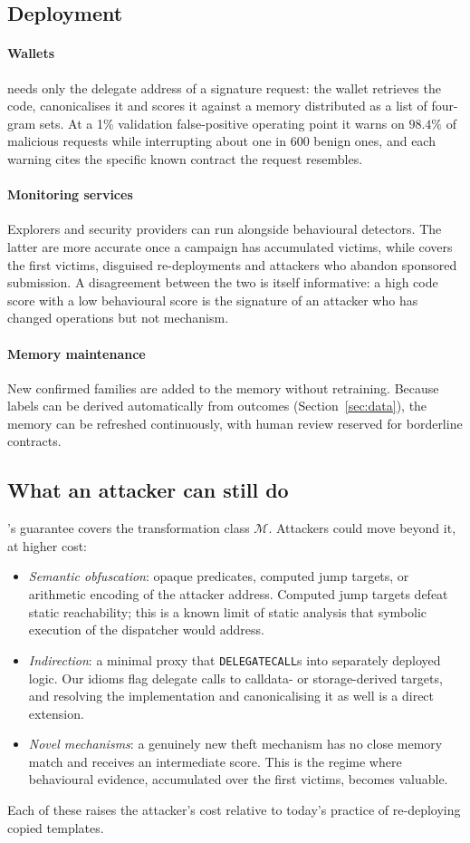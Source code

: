\subsection{Deployment}
\paragraph{Wallets} \dn{} needs only the delegate address of a signature request: the wallet retrieves the code, canonicalises it and scores it against a memory distributed as a list of four-gram sets. At a 1\% validation false-positive operating point it warns on $98.4\%$ of malicious requests while interrupting about one in $600$ benign ones, and each warning cites the specific known contract the request resembles.
\paragraph{Monitoring services} Explorers and security providers can run \dn{} alongside behavioural detectors. The latter are more accurate once a campaign has accumulated victims, while \dn{} covers the first victims, disguised re-deployments and attackers who abandon sponsored submission. A disagreement between the two is itself informative: a high code score with a low behavioural score is the signature of an attacker who has changed operations but not mechanism.
\paragraph{Memory maintenance} New confirmed families are added to the memory without retraining. Because labels can be derived automatically from outcomes (Section~\ref{sec:data}), the memory can be refreshed continuously, with human review reserved for borderline contracts.

\subsection{What an attacker can still do}
\dn{}'s guarantee covers the transformation class $\mathcal{M}$. Attackers could move beyond it, at higher cost:
\begin{itemize}
\item \emph{Semantic obfuscation}: opaque predicates, computed jump targets, or arithmetic encoding of the attacker address. Computed jump targets defeat static reachability; this is a known limit of static analysis that symbolic execution of the dispatcher would address.
\item \emph{Indirection}: a minimal proxy that \texttt{DELEGATECALL}s into separately deployed logic. Our idioms flag delegate calls to calldata- or storage-derived targets, and resolving the implementation and canonicalising it as well is a direct extension.
\item \emph{Novel mechanisms}: a genuinely new theft mechanism has no close memory match and receives an intermediate score. This is the regime where behavioural evidence, accumulated over the first victims, becomes valuable.
\end{itemize}
Each of these raises the attacker's cost relative to today's practice of re-deploying copied templates.

